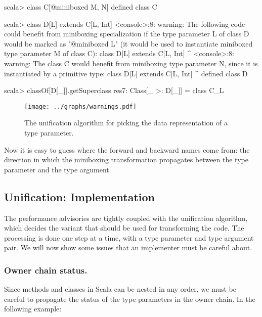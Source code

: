 \begin{lstlisting-nobreak-nolang}
scala> class C[@miniboxed M, N]
defined class C

scala> class D[L] extends C[L, Int]
<console>:8: warning: The following code could benefit from miniboxing specialization if the type parameter L of class D would be marked as "@miniboxed L" (it would be used to instantiate miniboxed type parameter M of class C):
       class D[L] extends C[L, Int]
               ^
<console>:8: warning: The class C would benefit from miniboxing type parameter N, since it is instantiated by a primitive type:
       class D[L] extends C[L, Int]
               ^
defined class D

scala> classOf[D[_]].getSuperclass
res7: Class[_ >: D[_]] = class C_L
\end{lstlisting-nobreak-nolang}

\begin{figure}[t!]
  \vspace{0.01\textheight}
  \centering
  \texttt{[image: ../graphs/warnings.pdf]}
  \caption{The unification algorithm for picking the data representation of a type parameter.}
  \label{fig:algorithm}
\end{figure}

Now it is easy to guess where the forward and backward names come from: the direction in which the miniboxing transformation propagates between the type parameter and the type argument.



\subsection{Unification: Implementation}



The performance advisories are tightly coupled with the unification algorithm, which decides the variant that should be used for transforming the code. The processing is done one step at a time, with a type parameter and type argument pair. We will now show some issues that an implementer must be careful about.



\subsubsection*{Owner chain status.} Since methods and classes in Scala can be nested in any order, we must be careful to propagate the status of the type parameters in the owner chain. In the following example:

